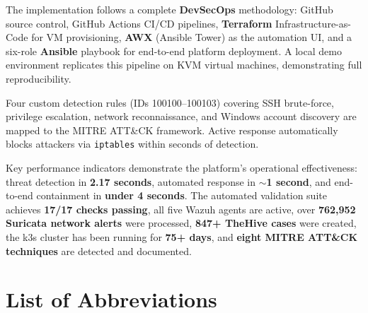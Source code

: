 \documentclass[12pt,a4paper]{report}
\begin{document}
The implementation follows a complete \textbf{DevSecOps} methodology: GitHub source control, GitHub Actions CI/CD pipelines, \textbf{Terraform} Infrastructure-as-Code for VM provisioning, \textbf{AWX} (Ansible Tower) as the automation UI, and a six-role \textbf{Ansible} playbook for end-to-end platform deployment. A local demo environment replicates this pipeline on KVM virtual machines, demonstrating full reproducibility.

Four custom detection rules (IDs 100100--100103) covering SSH brute-force, privilege escalation, network reconnaissance, and Windows account discovery are mapped to the MITRE ATT\&CK framework. Active response automatically blocks attackers via \texttt{iptables} within seconds of detection.

Key performance indicators demonstrate the platform's operational effectiveness: threat detection in \textbf{2.17 seconds}, automated response in \textbf{$\sim$1 second}, and end-to-end containment in \textbf{under 4 seconds}. The automated validation suite achieves \textbf{17/17 checks passing}, all five Wazuh agents are active, over \textbf{762,952 Suricata network alerts} were processed, \textbf{847+ TheHive cases} were created, the k3s cluster has been running for \textbf{75+ days}, and \textbf{eight MITRE ATT\&CK techniques} are detected and documented.

\newpage\tableofcontents
\newpage\listoffigures{}
\newpage\listoftables{}

\newpage
\chapter*{List of Abbreviations}
\end{document}
